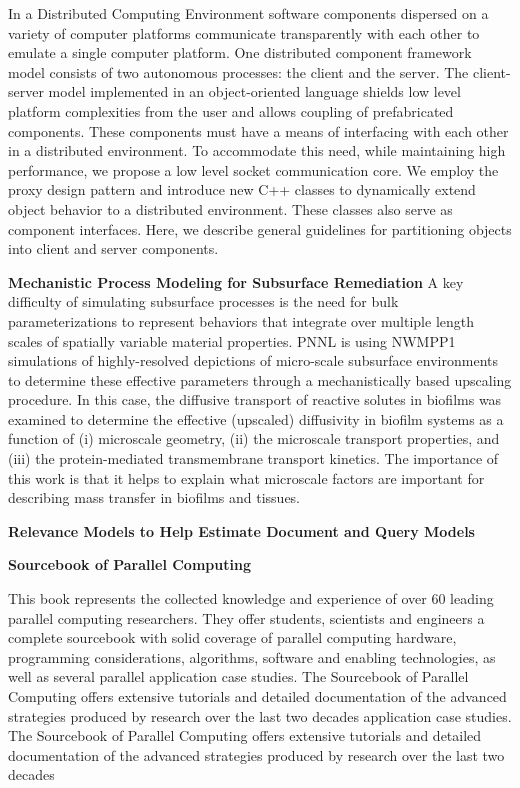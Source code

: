 \documentclass[11pt]{article}
\begin{document}
\noindent
In a Distributed Computing Environment software components dispersed
on a variety of computer platforms communicate transparently with each
other to emulate a single computer platform. One distributed component
framework model consists of two autonomous processes: the client and
the server. The client-server model implemented in an object-oriented
language shields low level platform complexities from the user and
allows coupling of prefabricated components. These components must
have a means of interfacing with each other in a distributed
environment. To accommodate this need, while maintaining high
performance, we propose a low level socket communication core. We
employ the proxy design pattern and introduce new C++ classes to
dynamically extend object behavior to a distributed environment. These
classes also serve as component interfaces. Here, we describe general
guidelines for partitioning objects into client and server components.

\bigskip
\noindent
\textbf{Mechanistic Process Modeling for Subsurface Remediation}
\cite{yabusaki02mechanistic}
\noindent
A key difficulty of simulating subsurface processes is the
need for bulk parameterizations to represent behaviors that integrate
over multiple length scales of spatially variable material
properties. PNNL is using NWMPP1 simulations of highly-resolved
depictions of micro-scale subsurface environments to determine these
effective parameters through a mechanistically based upscaling
procedure. In this case, the diffusive transport of reactive solutes
in biofilms was examined to determine the effective (upscaled)
diffusivity in biofilm systems as a function of (i) microscale
geometry, (ii) the microscale transport properties, and (iii) the
protein-mediated transmembrane transport kinetics. The importance of
this work is that it helps to explain what microscale factors are
important for describing mass transfer in biofilms and tissues.


\bigskip
\noindent
\textbf{Relevance Models to Help Estimate Document and Query Models}
\cite{bodoff04relevance}

\bigskip
\noindent
\textbf{Sourcebook of Parallel Computing}
\cite{crpchandbook}

\noindent
This book represents the collected knowledge and experience of over 60
leading parallel computing researchers. They offer students,
scientists and engineers a complete sourcebook with solid coverage of
parallel computing hardware, programming considerations, algorithms,
software and enabling technologies, as well as several parallel
application case studies. The Sourcebook of Parallel Computing offers
extensive tutorials and detailed documentation of the advanced
strategies produced by research over the last two decades
application case studies. The Sourcebook of Parallel Computing offers
extensive tutorials and detailed documentation of the advanced
strategies produced by research over the last two decades
\end{document}
